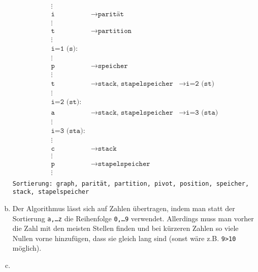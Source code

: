 \documentclass[11pt]{article}
\begin{document}
\begin{enumerate}[a)]
\begin{align*}
        \vdots & & \\ 
        \texttt{i} & \rightarrow \texttt{parität} & \\ 
        \vdots & & \\ 
        \texttt{t} & \rightarrow \texttt{partition} & \\ 
        \vdots & & \\ 
        \texttt{i=1 (s):} & & \\ 
        \vdots & & \\ 
        \texttt{p} & \rightarrow \texttt{speicher} & \\ 
        \vdots & & \\ 
        \texttt{t} & \rightarrow \texttt{stack, stapelspeicher} & \rightarrow
          \texttt{i=2 (st)} \\ 
        \vdots & & \\ 
        \texttt{i=2 (st):} & & \\ 
        \texttt{a} & \rightarrow \texttt{stack, stapelspeicher} & \rightarrow
          \texttt{i=3 (sta)} \\ 
        \vdots & & \\ 
        \texttt{i=3 (sta):} & & \\
        \vdots & & \\ 
        \texttt{c} & \rightarrow \texttt{stack} & \\ 
        \vdots & & \\ 
        \texttt{p} & \rightarrow \texttt{stapelspeicher} & \\ 
        \vdots & & \\ 
      \end{align*}
      \texttt{Sortierung: graph, parität, partition, pivot, position, speicher,
        stack, stapelspeicher}
    \item 
      Der Algorithmus lässt sich auf Zahlen übertragen, indem man statt der
      Sortierung \texttt{a,\dots z} die Reihenfolge \texttt{0,\dots 9}
      verwendet. Allerdings muss man vorher die Zahl mit den meisten Stellen
      finden und bei kürzeren Zahlen so viele Nullen vorne hinzufügen, dass sie
      gleich lang sind (sonst wäre z.B. \texttt{9>10} möglich).
    \item 
  \end{enumerate}
\end{document}
